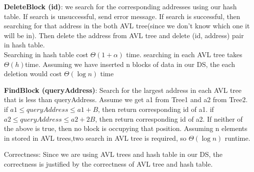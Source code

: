 \documentclass[12pt]{article}
\begin{document}
\textbf{DeleteBlock (id)}: we search for the corresponding addresses using our hash table. If search is unsuccessful, send error message. If search is successful, then searching for that address in the both AVL tree(since we don't know which one it will be in). Then delete the address from AVL tree and delete (id, address) pair in hash table.\\
Searching in hash table cost $\Theta(1+\alpha)$ time. searching in each AVL tree takes $\Theta(h)$time. Assuming we have inserted n blocks of data in our DS, the each deletion would cost $\Theta(\log n)$ time

\textbf{FindBlock (queryAddress)}:  Search for the largest address in each AVL tree that is less than queryAddress. Assume we get a1 from Tree1 and a2 from Tree2. if $ a1 \le queryAddress \le a1+B$, then return corresponding id of a1. if $ a2 \le queryAddress \le a2+2B$, then return corresponding id of a2. If neither of the above is true, then no block is occupying that position. Assuming n elements in stored in AVL trees,two search in AVL tree is required, so $\Theta(\log n)$ runtime.

Correctness: Since we are using AVL trees and hash table in our DS, the correctness is justified by the correctness of AVL tree and hash table.
\end{document}
